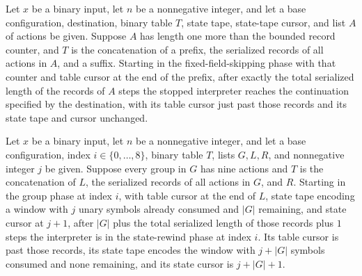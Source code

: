 \begin{lemma}
\label{Turing.timedCut_skip_records}
\leanok
{}
Let $x$ be a binary input, let $n$ be a nonnegative integer, and let a base
configuration, destination, binary table $T$, state tape, state-tape cursor, and list
$A$ of actions be given. Suppose $A$ has length one more than the bounded record
counter, and $T$ is the concatenation of a prefix, the serialized records of all actions
in $A$, and a suffix. Starting in the fixed-field-skipping phase with that counter and
table cursor at the end of the prefix, after exactly the total serialized length of the
records of $A$ steps the stopped interpreter reaches the continuation specified by the
destination, with its table cursor just past those records and its state tape and cursor
unchanged.
\end{lemma}

\begin{lemma}
\label{Turing.timedCut_skip_groups}
\leanok
{}
Let $x$ be a binary input, let $n$ be a nonnegative integer, and let a base
configuration, index $i\in\{0,\ldots,8\}$, binary table $T$, lists $G,L,R$, and
nonnegative integer $j$ be given. Suppose every group in $G$ has nine actions and $T$ is
the concatenation of $L$, the serialized records of all actions in $G$, and $R$.
Starting in the group phase at index $i$, with table cursor at the end of $L$, state
tape encoding a window with $j$ unary symbols already consumed and $|G|$ remaining, and
state cursor at $j+1$, after $|G|$ plus the total serialized length of those records
plus $1$ steps the interpreter is in the state-rewind phase at index $i$. Its table
cursor is past those records, its state tape encodes the window with $j+|G|$ symbols
consumed and none remaining, and its state cursor is $j+|G|+1$.
\end{lemma}

